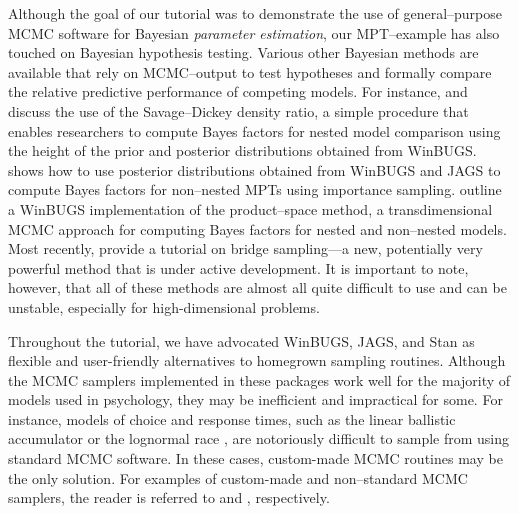 {Although the goal of our tutorial was to demonstrate the use of general--purpose MCMC software for Bayesian \textit{parameter estimation}, our MPT--example has also touched on Bayesian hypothesis testing. Various other Bayesian methods are available that rely on MCMC--output to test hypotheses and formally compare the relative predictive performance of competing models. For instance,  and  discuss the use of the Savage--Dickey density ratio, a simple procedure that enables researchers to compute Bayes factors \cite{Jeffreys1961,KassRaftery1995} for nested model comparison using the height of the prior and posterior distributions obtained from WinBUGS.  shows how to use posterior distributions obtained from WinBUGS and JAGS to compute Bayes factors for non--nested MPTs using importance sampling.  outline a WinBUGS implementation of the product--space method, a transdimensional MCMC approach for computing Bayes factors for nested and non--nested models}. Most recently,  provide a tutorial on bridge sampling---a new, potentially very powerful method that is under active development.  It is important to note, however, that all of these methods are almost all quite difficult to use and can be unstable, especially for high-dimensional problems.

{Throughout the tutorial, we have advocated WinBUGS, JAGS, and Stan as flexible and user-friendly alternatives to homegrown sampling routines. Although the MCMC samplers implemented in these packages work well for the majority of models used in psychology, they may be inefficient and impractical for some. For instance, models of choice and response times, such as the linear ballistic accumulator \cite{BrownHeathcote2008LBA} or the lognormal race \cite{rouder2015lognormal}, are notoriously difficult to sample from using standard MCMC software. In these cases, custom-made MCMC routines may be the only solution. For examples of custom-made and non--standard MCMC samplers, the reader is referred to  and , respectively.}

